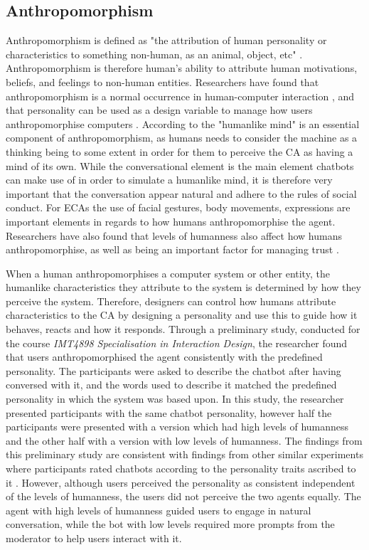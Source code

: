 \subsection{Anthropomorphism}
    \label{anthropomorphism}
Anthropomorphism is defined as "the attribution of human personality or characteristics to something non-human, as an animal, object, etc" \citep{oxd2018}. Anthropomorphism is therefore human's ability to attribute human motivations, beliefs, and feelings to non-human entities. Researchers have found that anthropomorphism is a normal occurrence in human-computer interaction \citep{Reeves1996,Cohen2004,Pearl2017,Lee2010}, and that personality can be used as a design variable to manage how users anthropomorphise computers \citep{Xiao2005}. According to \cite{Schroeder2016} the "humanlike mind" is an essential component of anthropomorphism, as humans needs to consider the machine as a thinking being to some extent in order for them to perceive the CA as having a mind of its own. While the conversational element is the main element chatbots can make use of in order to simulate a humanlike mind, it is therefore very important that the conversation appear natural and adhere to the rules of social conduct. For ECAs the use of facial gestures, body movements, expressions are important elements in regards to how humans anthropomorphise the agent. Researchers have also found that levels of humanness also affect how humans anthropomorphise, as well as being an important factor for managing trust \citep{Prada2003,Meyer2016,Dautenhahn2002,Terada2015,Epley2007,Lee2004}.

When a human anthropomorphises a computer system or other entity, the humanlike characteristics they attribute to the system is determined by how they perceive the system. Therefore, designers can control how humans attribute characteristics to the CA by designing a personality and use this to guide how it behaves, reacts and how it responds. Through a preliminary study, conducted for the course \textit{IMT4898 Specialisation in Interaction Design}, the researcher found that users anthropomorphised the agent consistently with the predefined personality. The participants were asked to describe the chatbot after having conversed with it, and the words used to describe it matched the predefined personality in which the system was based upon. In this study, the researcher presented participants with the same chatbot personality, however half the participants were presented with a version which had high levels of humanness and the other half with a version with low levels of humanness. The findings from this preliminary study are consistent with findings from other similar experiments where participants rated chatbots according to the personality traits ascribed to it \citep{Holtgraves2007}. However, although users perceived the personality as consistent independent of the levels of humanness, the users did not perceive the two agents equally. The agent with high levels of humanness guided users to engage in natural conversation, while the bot with low levels required more prompts from the moderator to help users interact with it.

